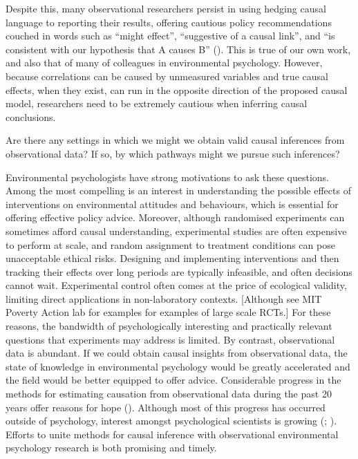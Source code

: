 \documentclass[
  singlecolumn]{article}
\begin{document}
Despite this, many observational researchers persist in using hedging
causal language to reporting their results, offering cautious policy
recommendations couched in words such as ``might effect'', ``suggestive
of a causal link'', and ``is consistent with our hypothesis that A
causes B'' (). This is true of
our own work, and also that of many of colleagues in environmental
psychology. However, because correlations can be caused by unmeasured
variables and true causal effects, when they exist, can run in the
opposite direction of the proposed causal model, researchers need to be
extremely cautious when inferring causal conclusions.

Are there any settings in which we might we obtain valid causal
inferences from observational data? If so, by which pathways might we
pursue such inferences?

Environmental psychologists have strong motivations to ask these
questions. Among the most compelling is an interest in understanding the
possible effects of interventions on environmental attitudes and
behaviours, which is essential for offering effective policy advice.
Moreover, although randomised experiments can sometimes afford causal
understanding, experimental studies are often expensive to perform at
scale, and random assignment to treatment conditions can pose
unacceptable ethical risks. Designing and implementing interventions and
then tracking their effects over long periods are typically infeasible,
and often decisions cannot wait. Experimental control often comes at the
price of ecological validity, limiting direct applications in
non-laboratory contexts. {[}Although see MIT Poverty Action lab for
examples for examples of large scale RCTs.{]} For these reasons, the
bandwidth of psychologically interesting and practically relevant
questions that experiments may address is limited. By contrast,
observational data is abundant. If we could obtain causal insights from
observational data, the state of knowledge in environmental psychology
would be greatly accelerated and the field would be better equipped to
offer advice. Considerable progress in the methods for estimating
causation from observational data during the past 20 years offer reasons
for hope (). Although
most of this progress has occurred outside of psychology, interest
amongst psychological scientists is growing
(;
). Efforts to unite methods for
causal inference with observational environmental psychology research is
both promising and timely.
\end{document}
